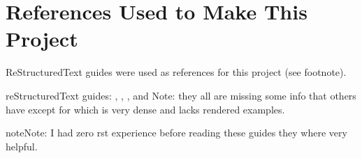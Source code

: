 \documentclass[letterpaper,10pt,english]{sphinxmanual}
\begin{document}
\section{References Used to Make This Project}
\label{\detokenize{design/used-references:references-used-to-make-this-project}}\label{\detokenize{design/used-references::doc}}
\sphinxAtStartPar
ReStructuredText guides were used as references for this project (see footnote). %
\begin{footnote}[1]\sphinxAtStartFootnote
reStructuredText guides: , , , and  Note: they all are missing some info that others have except for  which is very dense and lacks rendered examples.
%
\end{footnote}

\begin{sphinxadmonition}{note}{Note:}
\sphinxAtStartPar
I had zero rst experience before reading these guides they where very helpful.
\end{sphinxadmonition}


\renewcommand{\indexname}{Python Module Index}
\begin{sphinxtheindex}
\let\bigletter\sphinxstyleindexlettergroup
\bigletter{s}
\item\relax{}
\end{sphinxtheindex}

\renewcommand{\indexname}{Index}
\printindex
\end{document}
